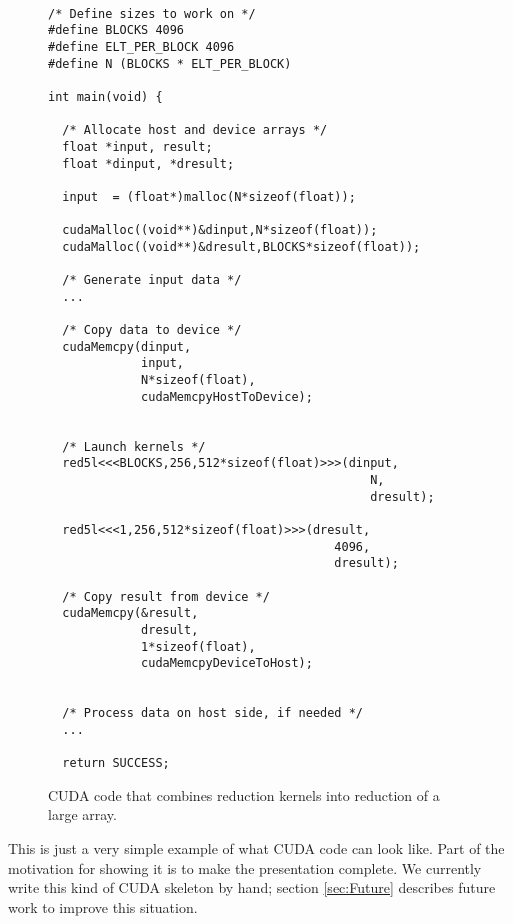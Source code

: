 \begin{figure} 
\begin{small}
\begin{Verbatim}[samepage=true] 

/* Define sizes to work on */ 
#define BLOCKS 4096
#define ELT_PER_BLOCK 4096
#define N (BLOCKS * ELT_PER_BLOCK)

int main(void) {
  
  /* Allocate host and device arrays */ 
  float *input, result; 
  float *dinput, *dresult; 
   
  input  = (float*)malloc(N*sizeof(float));
 
  cudaMalloc((void**)&dinput,N*sizeof(float));
  cudaMalloc((void**)&dresult,BLOCKS*sizeof(float));

  /* Generate input data */
  ... 

  /* Copy data to device */
  cudaMemcpy(dinput,
             input,
             N*sizeof(float),
             cudaMemcpyHostToDevice);

  
  /* Launch kernels */ 
  red5l<<<BLOCKS,256,512*sizeof(float)>>>(dinput,
                                             N,
                                             dresult);
  
  red5l<<<1,256,512*sizeof(float)>>>(dresult,
                                        4096,
                                        dresult); 

  /* Copy result from device */ 
  cudaMemcpy(&result,
             dresult,
             1*sizeof(float),
             cudaMemcpyDeviceToHost);

  
  /* Process data on host side, if needed */
  ... 

  return SUCCESS; 
\end{Verbatim} 
\end{small}
\caption{CUDA code that combines reduction kernels into reduction of a large array.}
\label{fig:cudareductioncode}
\end{figure}

This is just a very simple example of what CUDA code can look like. Part of 
the motivation for showing it is to make the presentation complete. 
We currently write this kind of CUDA skeleton by hand; section \ref{sec:Future} 
describes future work to improve this situation. 


